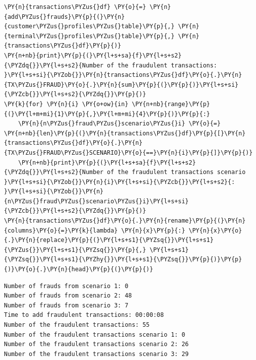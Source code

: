     \begin{tcolorbox}[breakable, size=fbox, boxrule=1pt, pad at break*=1mm,colback=cellbackground, colframe=cellborder]
\begin{Verbatim}[commandchars=\\\{\}]
\PY{n}{transactions\PYZus{}df} \PY{o}{=} \PY{n}{add\PYZus{}frauds}\PY{p}{(}\PY{n}{customer\PYZus{}profiles\PYZus{}table}\PY{p}{,} \PY{n}{terminal\PYZus{}profiles\PYZus{}table}\PY{p}{,} \PY{n}{transactions\PYZus{}df}\PY{p}{)}
\PY{n+nb}{print}\PY{p}{(}\PY{l+s+sa}{f}\PY{l+s+s2}{\PYZdq{}}\PY{l+s+s2}{Number of the fraudulent transactions: }\PY{l+s+si}{\PYZob{}}\PY{n}{transactions\PYZus{}df}\PY{o}{.}\PY{n}{TX\PYZus{}FRAUD}\PY{o}{.}\PY{n}{sum}\PY{p}{(}\PY{p}{)}\PY{l+s+si}{\PYZcb{}}\PY{l+s+s2}{\PYZdq{}}\PY{p}{)}
\PY{k}{for} \PY{n}{i} \PY{o+ow}{in} \PY{n+nb}{range}\PY{p}{(}\PY{l+m+mi}{1}\PY{p}{,}\PY{l+m+mi}{4}\PY{p}{)}\PY{p}{:}
    \PY{n}{n\PYZus{}fraud\PYZus{}scenario\PYZus{}i} \PY{o}{=} \PY{n+nb}{len}\PY{p}{(}\PY{n}{transactions\PYZus{}df}\PY{p}{[}\PY{n}{transactions\PYZus{}df}\PY{o}{.}\PY{n}{TX\PYZus{}FRAUD\PYZus{}SCENARIO}\PY{o}{==}\PY{n}{i}\PY{p}{]}\PY{p}{)}
    \PY{n+nb}{print}\PY{p}{(}\PY{l+s+sa}{f}\PY{l+s+s2}{\PYZdq{}}\PY{l+s+s2}{Number of the fraudulent transactions scenario }\PY{l+s+si}{\PYZob{}}\PY{n}{i}\PY{l+s+si}{\PYZcb{}}\PY{l+s+s2}{: }\PY{l+s+si}{\PYZob{}}\PY{n}{n\PYZus{}fraud\PYZus{}scenario\PYZus{}i}\PY{l+s+si}{\PYZcb{}}\PY{l+s+s2}{\PYZdq{}}\PY{p}{)}
\PY{n}{transactions\PYZus{}df}\PY{o}{.}\PY{n}{rename}\PY{p}{(}\PY{n}{columns}\PY{o}{=}\PY{k}{lambda} \PY{n}{x}\PY{p}{:} \PY{n}{x}\PY{o}{.}\PY{n}{replace}\PY{p}{(}\PY{l+s+s1}{\PYZsq{}}\PY{l+s+s1}{\PYZus{}}\PY{l+s+s1}{\PYZsq{}}\PY{p}{,} \PY{l+s+s1}{\PYZsq{}}\PY{l+s+s1}{\PYZhy{}}\PY{l+s+s1}{\PYZsq{}}\PY{p}{)}\PY{p}{)}\PY{o}{.}\PY{n}{head}\PY{p}{(}\PY{p}{)}
\end{Verbatim}
\end{tcolorbox}

    \begin{Verbatim}[commandchars=\\\{\}]
Number of frauds from scenario 1: 0
Number of frauds from scenario 2: 48
Number of frauds from scenario 3: 7
Time to add fraudulent transactions: 00:00:08
Number of the fraudulent transactions: 55
Number of the fraudulent transactions scenario 1: 0
Number of the fraudulent transactions scenario 2: 26
Number of the fraudulent transactions scenario 3: 29
    \end{Verbatim}
 
            
    

